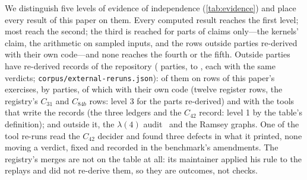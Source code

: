 \documentclass[preprint,11pt,a4paper]{elsarticle}
\theoremstyle{definition}
\begin{document}
We distinguish five levels of evidence of independence (\cref{tab:evidence}) and place every result of this paper on them. Every computed result reaches the first level; most reach the second; the third is reached for parts of claims only---the kernels' claim, the arithmetic on sampled inputs, and the rows outside parties re-derived with their own code---and none reaches the fourth or the fifth. Outside parties have re-derived \MtOutsideReruns{} records of the repository (\MtOutsideParties{} parties, \MtOutsideFirstDate{} to \MtOutsideLastDate{}, each with the same verdicts; \texttt{corpus/external-reruns.json}): \MtOutsideRerunsOnRows{} of them on rows of this paper's exercises, by \MtOutsidePartiesOnRows{} parties, of which \MtOutsideOnRowsOwn{} with their own code (twelve register rows, the registry's $C_{31}$ and $C_{84b}$ rows: level 3 for the parts re-derived) and \MtOutsideOnRowsTools{} with the tools that write the records (the three ledgers and the $C_{42}$ record: level 1 by the table's definition); and \MtOutsideRerunsElsewhere{} outside it, the $\lambda(4)$ audit~\citep{Lambda4Audit} and the Ramsey graphs. One of the tool re-runs read the $C_{42}$ decider and found three defects in what it printed, none moving a verdict, fixed and recorded in the benchmark's amendments. The registry's merges are not on the table at all: its maintainer applied his rule to the replays and did not re-derive them, so they are outcomes, not checks.
\end{document}
